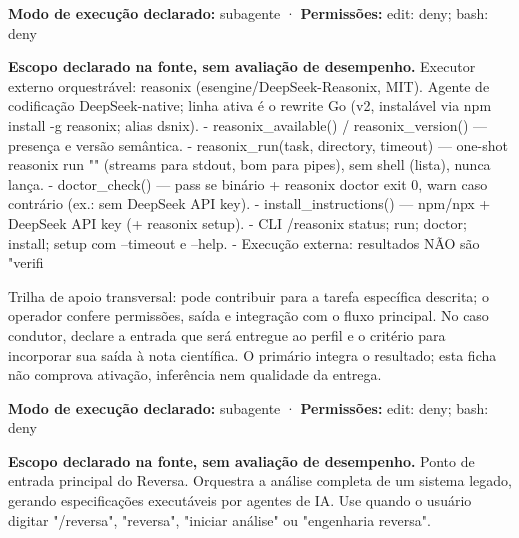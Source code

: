 \begin{arquitetura}
\textbf{Modo de execução declarado:} subagente · \textbf{Permissões:} edit: deny; bash: deny
\end{arquitetura}


\begin{descricao}
\textbf{Escopo declarado na fonte, sem avaliação de desempenho.}
Executor externo orquestrável: reasonix (esengine/DeepSeek-Reasonix, MIT). Agente de codificação DeepSeek-native; linha ativa é o rewrite Go (v2, instalável via npm install -g reasonix; alias dsnix). - reasonix\_available() / reasonix\_version() — presença e versão semântica. - reasonix\_run(task, directory, timeout) — one-shot reasonix run "" (streams para stdout, bom para pipes), sem shell (lista), nunca lança. - doctor\_check() — pass se binário + reasonix doctor exit 0, warn caso contrário (ex.: sem DeepSeek API key). - install\_instructions() — npm/npx + DeepSeek API key (+ reasonix setup). - CLI /reasonix status; run; doctor; install; setup com --timeout e --help. - Execução externa: resultados NÃO são "verifi
\end{descricao}

\begin{funcao}
Trilha de apoio transversal: pode contribuir para a tarefa específica descrita; o operador confere permissões, saída e integração com o fluxo principal. No caso condutor, declare a entrada que será entregue ao perfil e o critério para incorporar sua saída à nota científica. O primário integra o resultado; esta ficha não comprova ativação, inferência nem qualidade da entrega.
\end{funcao}

\begin{arquitetura}
\textbf{Modo de execução declarado:} subagente · \textbf{Permissões:} edit: deny; bash: deny
\end{arquitetura}


\begin{descricao}
\textbf{Escopo declarado na fonte, sem avaliação de desempenho.}
Ponto de entrada principal do Reversa. Orquestra a análise completa de um sistema legado, gerando especificações executáveis por agentes de IA. Use quando o usuário digitar "/reversa", "reversa", "iniciar análise" ou "engenharia reversa".
\end{descricao}

